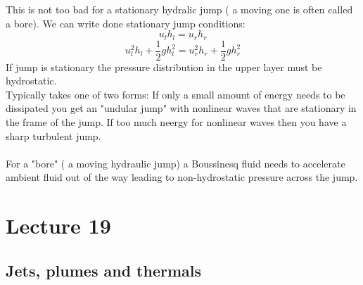 \documentclass{article}
\begin{document}
This is not too bad for a stationary hydralic jump ( a moving one is often called a bore). We can write done stationary jump conditions:
$$
u_l h_l = u_r h_r
$$
$$
u_l^2 h_l + \frac{1}{2} gh_l^2 = u_r^2 h_r + \frac{1}{2} g h_r^2
$$
If jump is stationary the pressure distribution in the upper layer must be hydrostatic.\\
Typically takes one of two forms:
If only a small amount of energy needs to be dissipated you get an "undular jump" with nonlinear waves that are stationary in the frame of the jump. If too much neergy for nonlinear waves then you have a sharp turbulent jump.\\\\
For a "bore" ( a moving hydraulic jump) a Boussinesq fluid needs to accelerate ambient fluid out of the way leading to non-hydrostatic pressure across the jump.
\section{Lecture 19}
\subsection{Jets, plumes and thermals}
\end{document}

